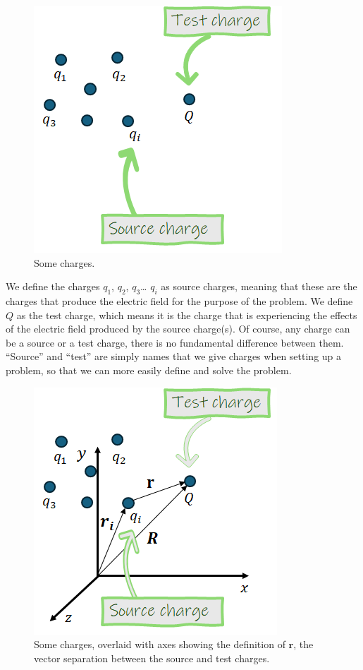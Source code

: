\documentclass[
  letterpaper,
  DIV=11,
  numbers=noendperiod]{scrreprt}
\begin{document}
\begin{figure}[H]

{\centering \includegraphics{Figures/sourcetest_definitions.png}

}

\caption{Some charges.}

\end{figure}%

We define the charges \(q_1\), \(q_2\), \(q_3\)\ldots{} \(q_i\) as
source charges, meaning that these are the charges that produce the
electric field for the purpose of the problem. We define \(Q\) as the
test charge, which means it is the charge that is experiencing the
effects of the electric field produced by the source charge(s). Of
course, any charge can be a source or a test charge, there is no
fundamental difference between them. ``Source'' and ``test'' are simply
names that we give charges when setting up a problem, so that we can
more easily define and solve the problem.

\begin{figure}[H]

{\centering \includegraphics{Figures/axes_r_definitions.png}

}

\caption{Some charges, overlaid with axes showing the definition of
\(\mathrm{\mathbf{r}}\), the vector separation between the source and
test charges.}

\end{figure}%
\end{document}
